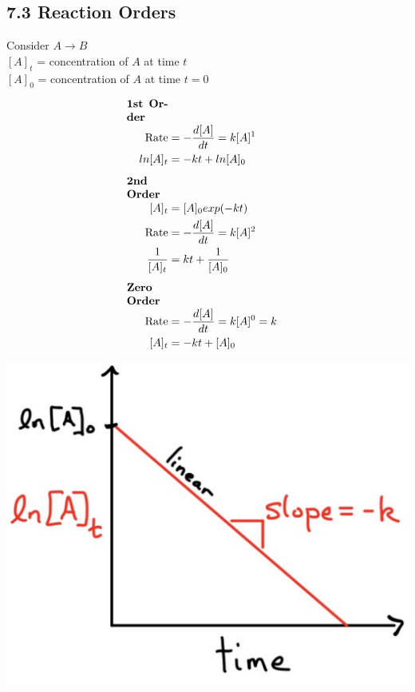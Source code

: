 \subsection{7.3 Reaction Orders}
\vspace*{0.5em}
Consider $A \longrightarrow B$\\
$[A]_t$ = concentration of $A$ at time $t$\\
$[A]_0$ = concentration of $A$ at time $t=0$

\begin{minipage}{0.99\linewidth}
    \begin{minipage}{0.65\linewidth}
        \begin{align*}
            \parbox{1.3cm}{\textbf{1st Order}}\\
            \text{Rate} &= -\frac{d[A]}{d t} = k[A]^1 \\
            ln[A]_t &= -k t + ln[A]_0
            \\[0.5em]
            \parbox{1.3cm}{\textbf{2nd Order}}\\
            [A]_t& = [A]_0 exp(-k t)\\
            \text{Rate} &= -\frac{d[A]}{d t} = k[A]^2 \\
            \frac{1}{[A]_t} &= k t + \frac{1}{[A]_0}
            \\[0.5em]
            \parbox{1.3cm}{\textbf{Zero Order}}\\
            \text{Rate} &= -\frac{d[A]}{d t} = k[A]^0 = k \\
            [A]_t &= -k t + [A]_0 \\
        \end{align*}
    \end{minipage}
    \begin{minipage}{0.34\linewidth}
        \includegraphics[width=0.9\linewidth]{src/7_Kinetics/images/1st_order.pdf}


\end{minipage}
\end{minipage}
